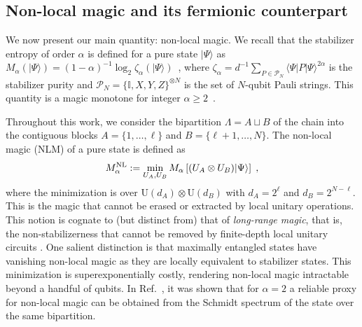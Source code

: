 \documentclass[prx,twocolumn,superscriptaddress,aps,10pt, frontmatterverbose, reprint,footinbib,longbibliography=true]{revtex4-2}
\newcommand{\RENYI}{\alpha}
\begin{document}
\subsection{Non-local magic and its fermionic counterpart}
We now present our main quantity: non-local magic.
We recall that the stabilizer entropy of order $\RENYI$ is defined for a pure state $|\Psi\rangle$ as $M_\RENYI(|\Psi\rangle)=(1-\RENYI)^{-1}\log_2 \zeta_\RENYI(|\Psi\rangle)$~\cite{Leone2022SRE}, where $\zeta_\RENYI= d^{-1}\sum_{P\in \mathcal{P}_N} \langle \Psi|P|\Psi\rangle^{2\RENYI}$ is the stabilizer purity and $\mathcal{P}_N=\{ \mathbb{I},X,Y,Z\}^{\otimes N}$  is the set of $N$-qubit Pauli strings. This quantity is a magic monotone for integer $\RENYI\ge 2$~\cite{piro,leone2024stabilizer}.

Throughout this work, we consider the bipartition $\Lambda = A\sqcup B$ of the chain into the contiguous blocks $A=\{1,\dots,\ell\}$ and $B=\{\ell+1,\dots,N\}$. The non-local magic (NLM) of a pure state is defined as 
\begin{equation}
    M_\RENYI^\textup{NL}:= \min_{U_A , U_B} M_\RENYI\left[(U_A\otimes U_B)|\Psi\rangle\right]\;,\label{eq:defNLmagic}
\end{equation}
where the minimization is over $\mathrm{U}(d_A)\otimes \mathrm{U}(d_B)$ with $d_A=2^{\ell}$ and $d_B = 2^{N-\ell}$. This is the magic that cannot be erased or extracted by local unitary operations. This notion is cognate to (but distinct from) that of {\em long-range magic}, that is, the non-stabilizerness that cannot be removed by finite-depth local unitary circuits \cite{Korbany2025}. One salient distinction is that maximally entangled states have vanishing non-local magic as they are locally equivalent to stabilizer states.
This minimization is superexponentially costly, rendering non-local magic intractable beyond a handful of qubits.
In Ref.~\cite{Cao_2025}, it was shown that for $\RENYI = 2$ a reliable proxy for non-local magic can be obtained from the Schmidt spectrum of the state over the same bipartition.
\end{document}
